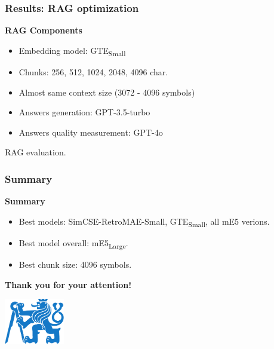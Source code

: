 \documentclass{beamer}
\newif\ifplacelogo
\begin{document}
\begin{frame}
  \frametitle{Results: RAG optimization}
  \textcolor{cvut_navy}{\textbf{RAG Components}}
  \begin{itemize}
    \item Embedding model: GTE\textsubscript{Small}
    \item Chunks: 256, 512, 1024, 2048, 4096 char.
    \item Almost same context size (3072 - 4096 symbols)
    \item Answers generation: GPT-3.5-turbo
    \item Answers quality measurement: GPT-4o
  \end{itemize}
  
  \begin{table}
    
    \caption{RAG evaluation.}
  \end{table}
\end{frame}


\placelogofalse 
\begin{frame}
  \frametitle{Summary}
  \textcolor{cvut_navy}{\textbf{Summary}}
  \begin{itemize}
    \item Best models: SimCSE-RetroMAE-Small, GTE\textsubscript{Small}, all mE5 verions.
    \item Best model overall: mE5\textsubscript{Large}.
    \item Best chunk size: 4096 symbols.
  \end{itemize}
  \vspace{10px}
  \begin{center}
    \huge \textcolor{cvut_navy}{\textbf{Thank you for your attention!}}  
  \end{center}
  \vspace{10px}
  \begin{center}
    \includegraphics[height=2cm]{src/fig/pdfs/ctu_logo_blue_filled.pdf}
  \end{center}
\end{frame}
\end{document}
